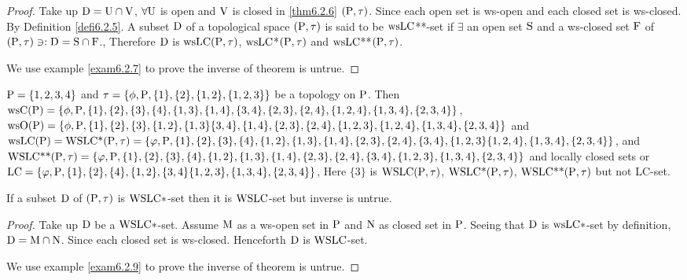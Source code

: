 \begin{proof}
Take up $\mathrm{D} = \mathrm{U} \cap \mathrm{V}$, $\forall \mathrm{U}$ is open and $\mathrm{V}$ is closed in \ref{thm6.2.6} $(\mathrm{P}, \tau)$. Since each open set is ws-open and each closed set is ws-closed. By Definition \ref{defi6.2.5}. A subset $\mathrm{D}$ of a topological space $(\mathrm{P}, \tau)$ is said to be $\mathrm{ws}\mathrm{LC}${*}{*}-set if $\exists$ an open set $\mathrm{S}$ and a ws-closed set $\mathrm{F}$ of $(\mathrm{P}, \tau) \ni: \mathrm{D} = \mathrm{S}\cap \mathrm{F}$., Therefore $\mathrm{D}$ is $\mathrm{ws}\mathrm{LC} (\mathrm{P}, \tau)$, $\mathrm{ws}\mathrm{LC}$*$(\mathrm{P}, \tau)$ and $\mathrm{ws}\mathrm{LC}${*}{*}$(\mathrm{P}, \tau)$.

We use example \ref{exam6.2.7} to prove the inverse of theorem is untrue.
\end{proof}

\begin{exm}\label{exam6.2.7}
$\mathrm{P} = \{1, 2, 3, 4\}$ and $\tau = \{\phi, \mathrm{P}, \{1\}, \{2\}, \{1, 2\}, \{1,2, 3\}\}$ be a topology on $\mathrm{P}$. Then $\ws\TSC(\TSP) = \{\phi, \TSP, \{1\}, \{2\}, \{3\}, \{4\}, \{1,3\}, \{1,4\},\{3,4\},\{2,3\}, \{2,4\},\break \{1,2, 4\},\{1,3,4\},\{2,3,4\}\}$, $\ws\TSO(\TSP) = \{\phi, \TSP, \{1\}, \{2\}, \{3\},\{1,2\},\{1,3\} \{3,4\}, \{1,4\},\break \{2,3\}, \{2,4\}, \{1,2,3\},\{1,2,4\},\{1,3,4\},\{2,3,4\}\}$ and $\mathrm{ws}\mathrm{L}\mathrm{C}(\mathrm{P})= \mathrm{WSLC}\text{*}(\mathrm{P}, \tau) = \{\varphi, \mathrm{P} ,\{1\}, \{2\}, \{3\},\{4\},\{1,2\},\{1,3\}, \{1,4\}, \{2,3\}, \{2,4\},\{3,4\}, \{1, 2, 3\}\{1,2,4\},\{1,3,4\},\{2,3,4\}\}$, and
$\mathrm{WSLC}\text{{*}{*}}(\mathrm{P}, \tau)= \{\varphi, \mathrm{P} ,\{1\}, \{2\}, \{3\},\{4\},\{1,2\},\{1,3\}, \{1,4\}, \{2,3\}, \{2,4\},\{3,4\}, \{1, 2,3\},\{1,3,4\},\{2,3,4\}\}$ and locally closed sets or $\mathrm{LC} = \{\varphi, \mathrm{P}, \{1\}, \{2\}, \{4\}, \{1,2\}, \{3, 4\}\{1,2,3\},\{1,3,4\},\{2,3,4\}\}$, Here $\{3\}$ is $\mathrm{WSLC} (\mathrm{P}, \tau)$, $\mathrm{WSLC}\text{*}(\mathrm{P}, \tau)$, $\mathrm{WSLC}\text{{*}{*}}(\mathrm{P}, \tau)$ but not LC-set.
\end{exm}

\begin{thm}\label{thm6.2.8}
If a subset $\mathrm{D}$ of $(\mathrm{P}, \tau)$ is $\mathrm{WSLC}*$-set then it is $\mathrm{WSLC}$-set but inverse is untrue.
\end{thm}

\begin{proof}
Take up $\mathrm{D}$ be a $\mathrm{WSLC}*$-set. Assume $\mathrm{M}$ as a ws-open set in $\mathrm{P}$ and $\mathrm{N}$ as closed set in $\mathrm{P}$. Seeing that $\mathrm{D}$ is $\mathrm{ws}\mathrm{LC}*$-set by definition, $\mathrm{D} = \mathrm{M} \cap \mathrm{N}$. Since each closed set is ws-closed. Henceforth $\mathrm{D}$ is $\mathrm{WSLC}$-set.

We use example \ref{exam6.2.9} to prove the inverse of theorem is untrue.
\end{proof}

